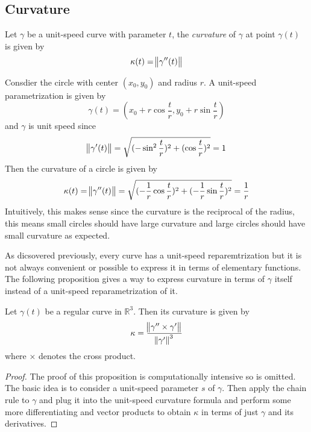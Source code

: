 
\subsection{Curvature}

\begin{definition}
  Let \(\gamma\) be a unit-speed curve with parameter \(t\), the
  \textit{curvature} of \(\gamma\) at point \(\gamma(t)\) is given by
  \[
\kappa(t) = \norm{\gamma''(t)}
\]
\end{definition}

\begin{example}
  Consdier the circle with center \((x_{0},y_{0})\) and radius \(r\). A unit-speed
  parametrization is given by
  \[
\gamma(t) = (x_{0} + r\cos \frac{t}{r}, y_{0} + r\sin \frac{t}{r})
\]
  and \(\gamma\) is unit speed since
  \[
\norm{\gamma'(t)} = \sqrt{(-\sin^{2}\frac{t}{r})^{2} + (\cos \frac{t}{r})^{2}
} = 1
\]
  Then the curvature of a circle is given by
  \[
\kappa(t) = \norm{\gamma''(t)} = \sqrt{(-\frac{1}{r}\cos\frac{t}{r})^{2} + (-\frac{1}{r}\sin \frac{t}{r})^{2}}
      = \frac{1}{r}
\]
  Intuitively, this makes sense since the curvature is the reciprocal of the
  radius, this means small circles should have large curvature and large circles
  should have small curvature as expected.
\end{example}

As dicsovered previously, every curve has a unit-speed reparemtrization but it
is not always convenient or possible to express it in terms of elementary
functions. The following proposition gives a way to express curvature in terms of
\(\gamma\) itself instead of a unit-speed reparametrization of it.

\begin{proposition}
  Let \(\gamma(t)\) be a regular curve in \(\mathbb{R}^{3}\). Then its curvature is given by
  \[
\kappa = \frac{\norm{\gamma'' \times \gamma'}}{\norm{\gamma'}^{3}}
\]
  where \(\times\) denotes the cross product.

  \begin{proof}
    The proof of this proposition is computationally intensive so is omitted.
    The basic idea is to consider a unit-speed parameter \(s\) of \(\gamma\). Then apply
    the chain rule to \(\gamma\) and plug it into the unit-speed curvature formula and
    perform some more differentiating and vector products to obtain \(\kappa\) in terms
    of just \(\gamma\) and its derivatives.
  \end{proof}
\end{proposition}

